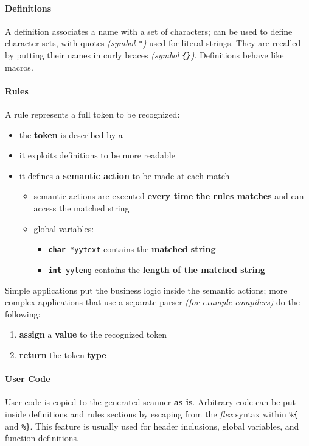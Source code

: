 \paragraph*{Definitions}
A definition associates a name with a set of characters;
\re can be used to define character sets, with quotes \textit{(symbol \texttt{"})} used for literal strings.
They are recalled by putting their names in curly braces \textit{(symbol \texttt{\{\}})}.
Definitions behave like \clang macros.

\paragraph*{Rules}
A rule represents a full token to be recognized:
\begin{itemize}
  \item the \textbf{token} is described by a \re
  \item it exploits definitions to be more readable
  \item it defines a \textbf{semantic action} to be made at each match
        \begin{itemize}
          \item semantic actions are executed \textbf{every time the rules matches} and can access the matched string
          \item global variables:
                \begin{itemize}[label=\textbf{\texttt{>}}]
                  \item \texttt{\textbf{char} *yytext} contains the \textbf{matched string}
                  \item \texttt{\textbf{int} yyleng} contains the \textbf{length of the matched string}
                \end{itemize}
        \end{itemize}
\end{itemize}
Simple applications put the business logic inside the semantic actions;
more complex applications that use a separate parser \textit{(for example compilers)} do the following:
\begin{enumerate}
  \item \textbf{assign} a \textbf{value} to the recognized token
  \item \textbf{return} the token \textbf{type}
\end{enumerate}

\paragraph*{User Code}
User \clang code is copied to the generated scanner \textbf{as is}.
Arbitrary code can be put inside definitions and rules sections by escaping from the \textit{flex} syntax within \texttt{\%\{} and \texttt{\%\}}.
This feature is usually used for header inclusions, global variables, and function definitions.


